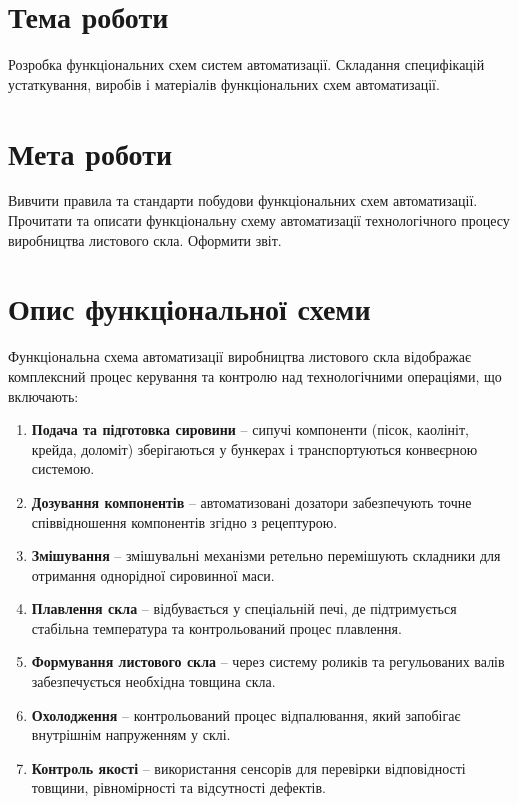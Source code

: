 \documentclass[a4paper]{article}
\begin{document}
\section*{Тема роботи}
Розробка функціональних схем 
систем автоматизації. Складання
специфікацій устаткування, 
виробів і матеріалів
функціональних схем  автоматизації.

\section*{Мета роботи}
Вивчити правила та стандарти побудови функціональних схем автоматизації. Прочитати та описати функціональну схему автоматизації технологічного процесу виробництва листового скла. Оформити звіт.


\section*{Опис функціональної схеми}
Функціональна схема автоматизації виробництва листового скла відображає комплексний процес керування та контролю над технологічними операціями, що включають:
\begin{enumerate}
    \item \textbf{Подача та підготовка сировини} – сипучі компоненти (пісок, каолініт, крейда, доломіт) зберігаються у бункерах і транспортуються конвеєрною системою.

    \item \textbf{Дозування компонентів} – автоматизовані дозатори забезпечують точне співвідношення компонентів згідно з рецептурою.
    \item \textbf{Змішування} – змішувальні механізми ретельно перемішують складники для отримання однорідної сировинної маси.
    \item \textbf{Плавлення скла} – відбувається у спеціальній печі, де підтримується стабільна температура та контрольований процес плавлення.
    \item \textbf{Формування листового скла} – через систему роликів та регульованих валів забезпечується необхідна товщина скла.
    \item \textbf{Охолодження} – контрольований процес відпалювання, який запобігає внутрішнім напруженням у склі.
    \item \textbf{Контроль якості} – використання сенсорів для перевірки відповідності товщини, рівномірності та відсутності дефектів.
\end{enumerate}
\end{document}
